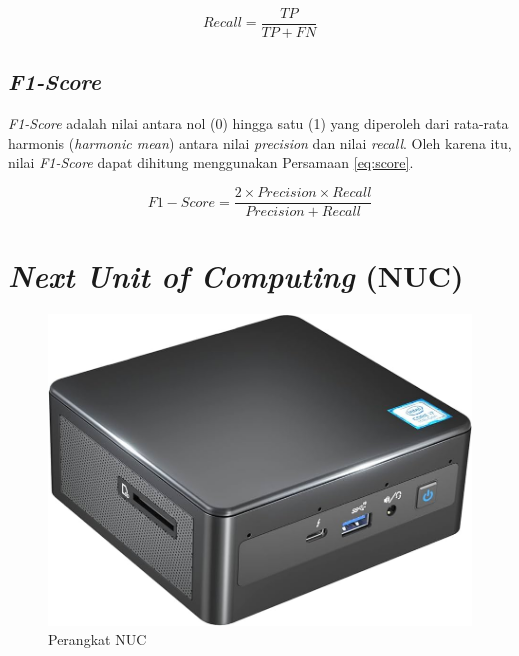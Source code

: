 \begin{equation}
  \label{eq:recall}
  Recall=\frac{TP}{TP+FN}
\end{equation}

\subsection{\emph{F1-Score}}
\label{subsec:score_klasifikasi}

\emph{F1-Score} adalah nilai antara nol (0) hingga satu (1) yang diperoleh dari rata-rata harmonis (\emph{harmonic mean}) antara nilai \emph{precision} dan nilai \emph{recall}. Oleh karena itu, nilai \emph{F1-Score} dapat dihitung menggunakan Persamaan \ref{eq:score}.

\begin{equation}
  \label{eq:score}
  F{1}{-}Score=\frac{2 \times Precision \times Recall}{Precision+Recall}
\end{equation}

\newpage

\section{\textit{Next Unit of Computing} (NUC)}

\begin{figure} [ht] \centering
    \includegraphics[scale=0.25]{gambar/nuc.jpg}
    \caption{Perangkat NUC}
    \label{fig:Perangkat NUC}
\end{figure}

